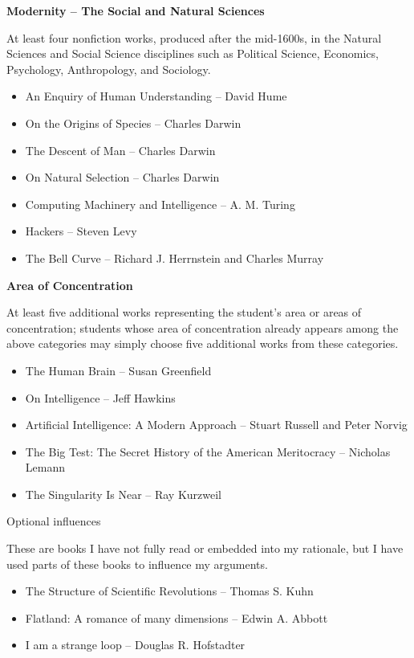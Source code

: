 \documentclass[11pt]{article}
\begin{document}
\par \textbf{Modernity -- The Social and Natural Sciences}
\par At least four nonfiction works, produced after the mid-1600s, in the Natural Sciences and Social Science disciplines such as Political Science, Economics, Psychology, Anthropology, and Sociology.
\begin{itemize}
	\item An Enquiry of Human Understanding -- David Hume
	\item On the Origins of Species -- Charles Darwin
	\item The Descent of Man -- Charles Darwin
	\item On Natural Selection -- Charles Darwin
	\item Computing Machinery and Intelligence -- A. M. Turing
	\item Hackers -- Steven Levy
	\item The Bell Curve -- Richard J. Herrnstein and Charles Murray
\end{itemize}

\par \textbf{Area of Concentration}
\par At least five additional works representing the student's area or areas of concentration; students whose area of concentration already appears among the above categories may simply choose five additional works from these categories.
\begin{itemize}
	\item The Human Brain -- Susan Greenfield
	\item On Intelligence -- Jeff Hawkins
	\item Artificial Intelligence: A Modern Approach -- Stuart Russell and Peter Norvig
	\item The Big Test: The Secret History of the American Meritocracy -- Nicholas Lemann
	\item The Singularity Is Near -- Ray Kurzweil
\end{itemize}

{\Large Optional influences\\\par}
\par These are books I have not fully read or embedded into my rationale, but I have used parts of these books to influence my arguments.
\begin{itemize}
	\item The Structure of Scientific Revolutions -- Thomas S. Kuhn
	\item Flatland: A romance of many dimensions -- Edwin A. Abbott
	\item I am a strange loop -- Douglas R. Hofstadter
\end{itemize}
\end{document}
